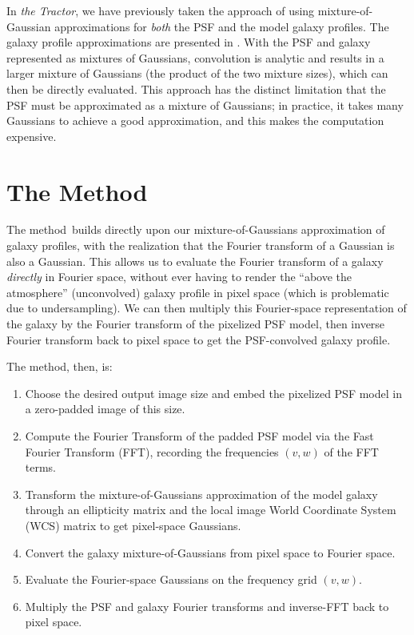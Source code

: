 \documentclass[11pt,preprint]{aastex}
\newcommand{\project}[1]{\textsl{#1}}
\newcommand{\trick}{method}
\newcommand{\Trick}{Method}
\begin{document}
In \project{the Tractor}, we have previously taken the approach of
using mixture-of-Gaussian approximations for \emph{both} the PSF and
the model galaxy profiles.  The galaxy profile approximations are
presented in \cite{moggalaxy}.  With the PSF and galaxy represented as
mixtures of Gaussians, convolution is analytic and results in a larger
mixture of Gaussians (the product of the two mixture sizes), which can
then be directly evaluated.  This approach has the distinct limitation
that the PSF must be approximated as a mixture of Gaussians; in
practice, it takes many Gaussians to achieve a good approximation, and
this makes the computation expensive.

\section{The \Trick}

The \trick\ builds directly upon our mixture-of-Gaussians
approximation of galaxy profiles, with the realization that the
Fourier transform of a Gaussian is also a Gaussian.  This allows us to
evaluate the Fourier transform of a galaxy \emph{directly} in Fourier
space, without ever having to render the ``above the atmosphere''
(unconvolved) galaxy profile in pixel space (which is problematic due
to undersampling).  We can then multiply this Fourier-space
representation of the galaxy by the Fourier transform of the pixelized
PSF model, then inverse Fourier transform back to pixel space to get
the PSF-convolved galaxy profile.

The method, then, is:
\begin{enumerate}
\item Choose the desired output image size and embed the pixelized PSF
  model in a zero-padded image of this size.
\item Compute the Fourier Transform of the padded PSF model via the
  Fast Fourier Transform (FFT),
  recording the frequencies $(v, w)$ of the FFT terms.
\item Transform the mixture-of-Gaussians approximation of the model
  galaxy through an ellipticity matrix and the local image World
  Coordinate System (WCS) matrix to get pixel-space Gaussians.
\item Convert the galaxy mixture-of-Gaussians from pixel space to Fourier space.
\item Evaluate the Fourier-space Gaussians on the frequency grid $(v, w)$.
\item Multiply the PSF and galaxy Fourier transforms and inverse-FFT
  back to pixel space.
\end{enumerate}
\end{document}
